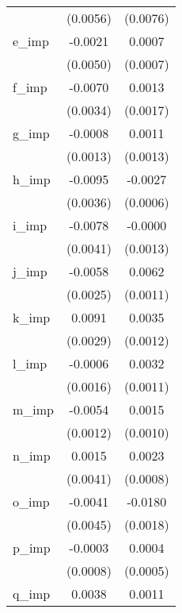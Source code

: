 {\begin{tabular}{l*{2}{c}}
            &    (0.0056)        &    (0.0076)        \\
[1em]
e\_imp       &     -0.0021        &      0.0007        \\
            &    (0.0050)        &    (0.0007)        \\
[1em]
f\_imp       &     -0.0070\sym{**}&      0.0013        \\
            &    (0.0034)        &    (0.0017)        \\
[1em]
g\_imp       &     -0.0008        &      0.0011        \\
            &    (0.0013)        &    (0.0013)        \\
[1em]
h\_imp       &     -0.0095\sym{**}&     -0.0027\sym{**}\\
            &    (0.0036)        &    (0.0006)        \\
[1em]
i\_imp       &     -0.0078\sym{*} &     -0.0000        \\
            &    (0.0041)        &    (0.0013)        \\
[1em]
j\_imp       &     -0.0058\sym{**}&      0.0062\sym{**}\\
            &    (0.0025)        &    (0.0011)        \\
[1em]
k\_imp       &      0.0091\sym{**}&      0.0035\sym{**}\\
            &    (0.0029)        &    (0.0012)        \\
[1em]
l\_imp       &     -0.0006        &      0.0032\sym{**}\\
            &    (0.0016)        &    (0.0011)        \\
[1em]
m\_imp       &     -0.0054\sym{**}&      0.0015        \\
            &    (0.0012)        &    (0.0010)        \\
[1em]
n\_imp       &      0.0015        &      0.0023\sym{**}\\
            &    (0.0041)        &    (0.0008)        \\
[1em]
o\_imp       &     -0.0041        &     -0.0180\sym{**}\\
            &    (0.0045)        &    (0.0018)        \\
[1em]
p\_imp       &     -0.0003        &      0.0004        \\
            &    (0.0008)        &    (0.0005)        \\
[1em]
q\_imp       &      0.0038\sym{**}&      0.0011\sym{*} \\

\end{tabular}}
